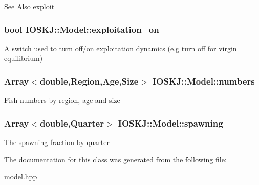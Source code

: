 \begin{DoxySeeAlso}{See Also}
exploit 
\end{DoxySeeAlso}
\hypertarget{classIOSKJ_1_1Model_ab9afc5bae0ac8e16817802e54bdfa60d}{
\subsubsection[{exploitation\-\_\-on}]{\setlength{\rightskip}{0pt plus 5cm}bool I\-O\-S\-K\-J\-::\-Model\-::exploitation\-\_\-on}}\label{classIOSKJ_1_1Model_ab9afc5bae0ac8e16817802e54bdfa60d}
A switch used to turn off/on exploitation dynamics (e.\-g turn off for virgin equilibrium) \hypertarget{classIOSKJ_1_1Model_aa90edf75b7c9ebf8e50a30f3779b9664}{
\subsubsection[{numbers}]{\setlength{\rightskip}{0pt plus 5cm}Array$<$double,Region,Age,Size$>$ I\-O\-S\-K\-J\-::\-Model\-::numbers}}\label{classIOSKJ_1_1Model_aa90edf75b7c9ebf8e50a30f3779b9664}
Fish numbers by region, age and size \hypertarget{classIOSKJ_1_1Model_a81bffc6707aa313f87bf21dbbf1d8143}{
\subsubsection[{spawning}]{\setlength{\rightskip}{0pt plus 5cm}Array$<$double,Quarter$>$ I\-O\-S\-K\-J\-::\-Model\-::spawning}}\label{classIOSKJ_1_1Model_a81bffc6707aa313f87bf21dbbf1d8143}
The spawning fraction by quarter 

The documentation for this class was generated from the following file\-:\begin{DoxyCompactItemize}
\item 
model.\-hpp\end{DoxyCompactItemize}
